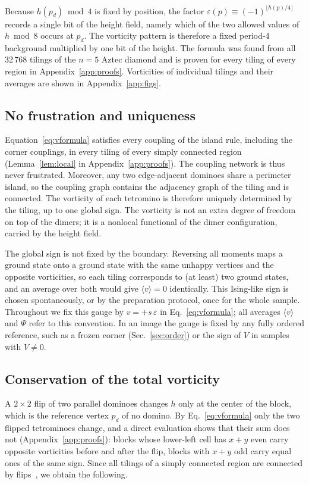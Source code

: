\documentclass[aps,prb,twocolumn,floatfix,longbibliography]{revtex4-2}
\newcommand{\eps}{\varepsilon}
\newcommand{\floor}[1]{\lfloor #1\rfloor}
\begin{document}
Because $h(p_d)\bmod 4$ is fixed by position, the factor $\eps(p)\equiv(-1)^{\floor{h(p)/4}}$ records a single bit of the height field, namely which of the two allowed values of $h\bmod 8$ occurs at $p_d$. The vorticity pattern is therefore a fixed period-4 background multiplied by one bit of the height. The formula was found from all 32\,768 tilings of the $n=5$ Aztec diamond and is proven for every tiling of every region in Appendix~\ref{app:proofs}. Vorticities of individual tilings and their averages are shown in Appendix~\ref{app:figs}.


\subsection{No frustration and uniqueness}

Equation~\eqref{eq:vformula} satisfies every coupling of the island rule, including the corner couplings, in every tiling of every simply connected region (Lemma~\ref{lem:local} in Appendix~\ref{app:proofs}). The coupling network is thus never frustrated. Moreover, any two edge-adjacent dominoes share a perimeter island, so the coupling graph contains the adjacency graph of the tiling and is connected. The vorticity of each tetromino is therefore uniquely determined by the tiling, up to one global sign. The vorticity is not an extra degree of freedom on top of the dimers; it is a nonlocal functional of the dimer configuration, carried by the height field.

The global sign is not fixed by the boundary. Reversing all moments maps a ground state onto a ground state with the same unhappy vertices and the opposite vorticities, so each tiling corresponds to (at least) two ground states, and an average over both would give $\langle v\rangle=0$ identically. This Ising-like sign is chosen spontaneously, or by the preparation protocol, once for the whole sample. Throughout we fix this gauge by $v=+s\,\eps$ in Eq.~\eqref{eq:vformula}; all averages $\langle v\rangle$ and $\Psi$ refer to this convention. In an image the gauge is fixed by any fully ordered reference, such as a frozen corner (Sec.~\ref{sec:order}) or the sign of $V$ in samples with $V\neq0$.

\subsection{Conservation of the total vorticity}

A $2\times2$ flip of two parallel dominoes changes $h$ only at the center of the block, which is the reference vertex $p_d$ of no domino. By Eq.~\eqref{eq:vformula} only the two flipped tetrominoes change, and a direct evaluation shows that their sum does not (Appendix~\ref{app:proofs}): blocks whose lower-left cell has $x+y$ even carry opposite vorticities before and after the flip, blocks with $x+y$ odd carry equal ones of the same sign. Since all tilings of a simply connected region are connected by flips~\cite{Thurston1990}, we obtain the following.
\end{document}
